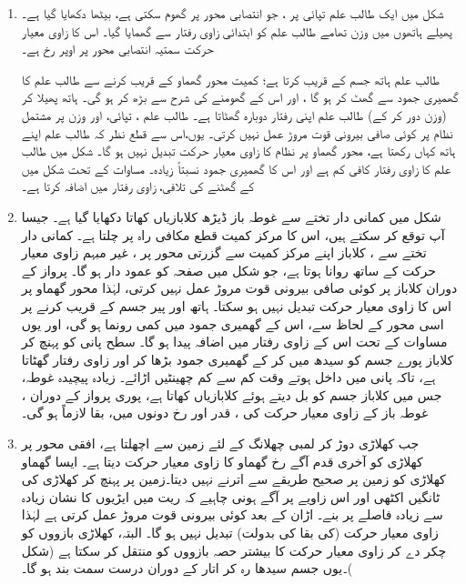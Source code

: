 \begin{enumerate}[1.]
\item
 \quad
شکل  میں ایک طالب علم   تپائی  پر ، جو انتصابی محور پر گھوم سکتی ہے، بیٹھا دکھایا گیا ہے۔ پھیلے  ہاتھوں میں   وزن تھامے طالب علم کو ابتدائی زاوی رفتار  سے گھمایا گیا۔ اس کا زاوی معیار حرکت سمتیہ  انتصابی محور پر اوپر رخ ہے۔

طالب علم ہاتھ جسم کے قریب کرتا ہے؛ کمیت محور گھماو کے قریب کرنے سے    طالب علم  کا گھمیری جمود  سے گھٹ کر  ہو گا ، اور اس کے گھومنے کی شرح  سے  بڑھ کر  ہو گی۔  ہاتھ  پھیلا کر (وزن دور کر کے)  طالب علم اپنی رفتار  دوبارہ گھٹاتا ہے۔
 طالب علم ، تپائی، اور وزن  پر مشتمل نظام پر کوئی صافی بیرونی قوت مروڑ عمل نہیں کرتی۔ یوں،اس سے قطع نظر کہ طالب علم اپنے ہاتھ کہاں رکھتا ہے،  محور گھماو پر  نظام  کا  زاوی معیار حرکت تبدیل نہیں ہو گا۔ شکل  میں  طالب علم کا زاوی رفتار  کافی کم ہے اور اس کا گھمیری جمود    نسبتاً زیادہ۔ مساوات   کے تحت شکل  میں     کے گھٹنے  کی تلافی،   زاوی رفتار  میں اضافہ کرتا ہے۔
 \item
 \quad
 شکل  میں کمانی دار تختے  سے غوطہ باز      ڈیڑھ کلابازیاں کھاتا دکھایا گیا ہے۔ جیسا آپ توقع کر سکتے ہیں، اس کا  مرکز کمیت قطع مکافی راہ پر چلتا ہے۔ کمانی دار تختے سے   ،  کلاباز  اپنے  مرکز کمیت  سے گزرتی محور  پر ، غیر   مبہم زاوی معیار حرکت   کے ساتھ روانا ہوتا ہے، جو شکل  میں صفحہ کو عمود دار ہو گا۔ پرواز کے دوران کلاباز پر کوئی صافی بیرونی قوت مروڑ عمل نہیں کرتی، لہٰذا  محور گھماو پر اس کا زاوی معیار حرکت تبدیل نہیں ہو سکتا۔ ہاتھ اور پیر جسم کے قریب کرنے پر اسی محور کے لحاظ سے، اس کے  گھمیری جمود   میں کمی رونما ہو گی،  اور یوں مساوات  کے تحت  اس کے  زاوی رفتار  میں اضافہ پیدا ہو گا۔ سطح پانی کو پہنچ کر کلاباز  پورے جسم کو سیدھ میں کر کے   گھمیری جمود بڑھا کر اور زاوی رفتار گھٹاتا ہے، تاکہ پانی میں  داخل ہوتے وقت کم سے کم چھینٹیں اڑائے۔ زیادہ پیچیدہ غوطہ،  جس میں کلاباز جسم کو بل دیتے ہوئے کلابازیاں کھاتا ہے، پوری پرواز    کے دوران ، غوطہ باز کے زاوی معیار حرکت  کی ، قدر اور رخ دونوں میں، بقا لازماً ہو گی۔
 \item
{}\quad
جب کھلاڑی دوڑ کر لمبی چھلانگ  کے لئے زمین سے اچھلتا ہے،  افقی محور پر کھلاڑی کو آخری قدم  آگے     رخ  گھماو کا زاوی معیار حرکت  دیتا ہے۔ ایسا گھماو کھلاڑی کو زمین پر  صحیح   طریقے سے اترنے نہیں دیتا۔زمین پر پہنچ کر کھلاڑی کی ٹانگیں  اکٹھی اور   اس زاویے پر آگے ہونی چاہیے  کہ ریت میں ایڑیوں کا نشان زیادہ سے زیادہ فاصلے پر بنے۔ اڑان کے بعد کوئی بیرونی قوت مروڑ عمل کرتی ہے لہٰذا  زاوی معیار حرکت  (کی  بقا کی بدولت)  تبدیل نہیں ہو گا۔ البتہ، کھلاڑی  بازووں کو   چکر دے کر زاوی  معیار حرکت کا بیشتر حصہ بازووں کو منتقل کر سکتا ہے (شکل )۔یوں جسم  سیدھا رہ کر اتار کے دوران  درست سمت بند ہو گا۔
 \end{enumerate}
 
